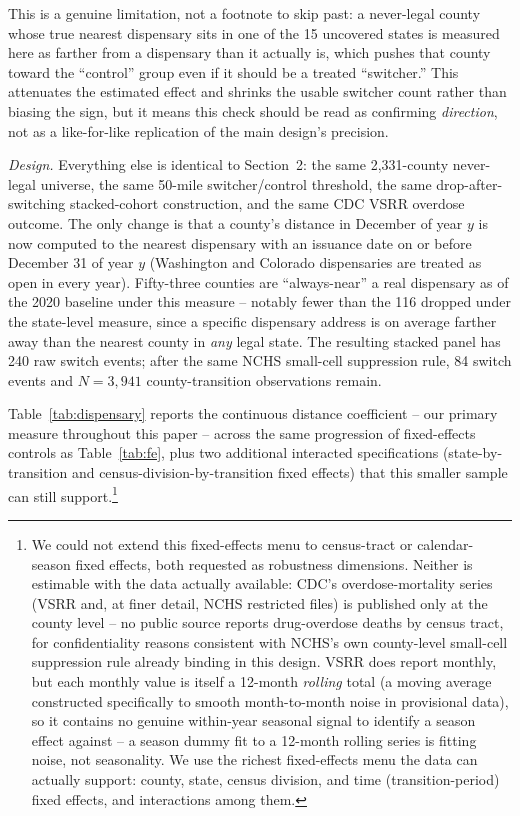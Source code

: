 \documentclass[11pt]{article}
\begin{document}
This is a genuine limitation, not a footnote to skip past: a
never-legal county whose true nearest dispensary sits in one of the 15
uncovered states is measured here as farther from a dispensary than it
actually is, which pushes that county toward the ``control'' group even
if it should be a treated ``switcher.'' This attenuates the estimated
effect and shrinks the usable switcher count rather than biasing the
sign, but it means this check should be read as confirming
\emph{direction}, not as a like-for-like replication of the main
design's precision.

\emph{Design.} Everything else is identical to Section~2: the same
2,331-county never-legal universe, the same 50-mile switcher/control
threshold, the same drop-after-switching stacked-cohort construction,
and the same CDC VSRR overdose outcome. The only change is that a
county's distance in December of year $y$ is now computed to the
nearest dispensary with an issuance date on or before December 31 of
year $y$ (Washington and Colorado dispensaries are treated as
open in every year). Fifty-three counties are ``always-near'' a real
dispensary as of the 2020 baseline under this measure -- notably fewer
than the 116 dropped under the state-level measure, since a specific
dispensary address is on average farther away than the nearest county
in \emph{any} legal state. The resulting stacked panel has 240 raw
switch events; after the same NCHS small-cell suppression rule, 84
switch events and $N=3{,}941$ county-transition observations remain.

Table~\ref{tab:dispensary} reports the continuous distance coefficient
-- our primary measure throughout this paper -- across the same
progression of fixed-effects controls as Table~\ref{tab:fe}, plus two
additional interacted specifications (state-by-transition and
census-division-by-transition fixed effects) that this smaller sample
can still support.\footnote{We could not extend this fixed-effects
menu to census-tract or calendar-season fixed effects, both requested
as robustness dimensions. Neither is estimable with the data actually
available: CDC's overdose-mortality series (VSRR and, at finer detail,
NCHS restricted files) is published only at the county level -- no
public source reports drug-overdose deaths by census tract, for
confidentiality reasons consistent with NCHS's own county-level
small-cell suppression rule already binding in this design. VSRR does
report monthly, but each monthly value is itself a 12-month
\emph{rolling} total (a moving average constructed specifically to
smooth month-to-month noise in provisional data), so it contains no
genuine within-year seasonal signal to identify a season effect
against -- a season dummy fit to a 12-month rolling series is fitting
noise, not seasonality. We use the richest fixed-effects menu the data
can actually support: county, state, census division, and
time (transition-period) fixed effects, and interactions among them.}
\end{document}
